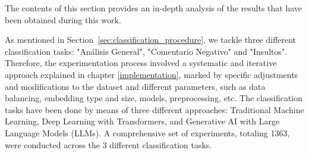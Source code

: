 

The contents of this section provides an in-depth analysis of the results that have been obtained during this work.

As mentioned in Section~\ref{sec:classification_procedure}, we tackle three different classification tasks: "Análisis General", "Comentario Negativo" and "Insultos". Therefore, the experimentation process involved a systematic and iterative approach explained in chapter \ref{implementation}, marked by specific adjustments and modifications to the dataset and different parameters, such as data balancing, embedding type and size, models, preprocessing, etc. The classification tasks have been done by means of three different approaches: Traditional Machine Learning, Deep Learning with Transformers, and Generative AI with Large Language Models (LLMs). A comprehensive set of experiments, totaling 1363, were conducted across the 3 different classification tasks.



